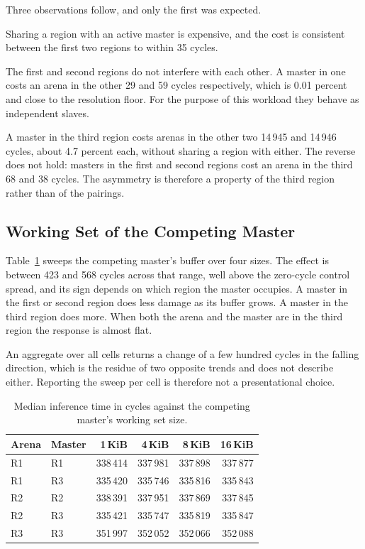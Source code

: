 \documentclass[conference]{IEEEtran}
\begin{document}
Three observations follow, and only the first was expected.

Sharing a region with an active master is expensive, and the cost is
consistent between the first two regions to within 35 cycles.

The first and second regions do not interfere with each other. A master
in one costs an arena in the other 29 and 59 cycles respectively, which
is 0.01 percent and close to the resolution floor. For the purpose of
this workload they behave as independent slaves.

A master in the third region costs arenas in the other two 14\,945 and
14\,946 cycles, about 4.7 percent each, without sharing a region with
either. The reverse does not hold: masters in the first and second
regions cost an arena in the third 68 and 38 cycles. The asymmetry is
therefore a property of the third region rather than of the pairings.

\subsection{Working Set of the Competing Master}

Table~\ref{tab:sweep} sweeps the competing master's buffer over four
sizes. The effect is between 423 and 568 cycles across that range, well
above the zero-cycle control spread, and its sign depends on which region
the master occupies. A master in the first or second region does less
damage as its buffer grows. A master in the third region does more. When
both the arena and the master are in the third region the response is
almost flat.

An aggregate over all cells returns a change of a few hundred cycles in
the falling direction, which is the residue of two opposite trends and
does not describe either. Reporting the sweep per cell is therefore not a
presentational choice.

\begin{table}[t]
\caption{Median inference time in cycles against the competing master's
working set size.}
\label{tab:sweep}
\centering
\begin{tabular}{llrrrr}
\toprule
Arena & Master & 1\,KiB & 4\,KiB & 8\,KiB & 16\,KiB \\
\midrule
R1 & R1 & 338\,414 & 337\,981 & 337\,898 & 337\,877 \\
R1 & R3 & 335\,420 & 335\,746 & 335\,816 & 335\,843 \\
R2 & R2 & 338\,391 & 337\,951 & 337\,869 & 337\,845 \\
R2 & R3 & 335\,421 & 335\,747 & 335\,819 & 335\,847 \\
R3 & R3 & 351\,997 & 352\,052 & 352\,066 & 352\,088 \\
\bottomrule
\end{tabular}
\end{table}
\end{document}
